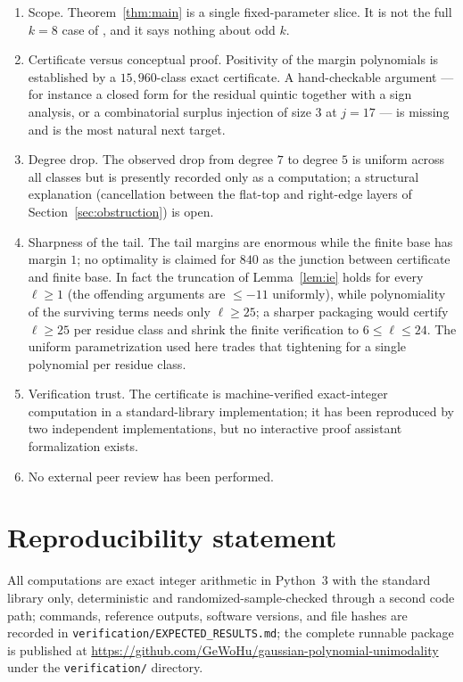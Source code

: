 \documentclass[11pt]{article}
\theoremstyle{definition}
\begin{document}
\begin{enumerate}
\item Scope. Theorem~\ref{thm:main} is a single fixed-parameter slice. It is not the full $k=8$
case of \cite{sz}, and it says nothing about odd $k$.
\item Certificate versus conceptual proof. Positivity of the margin polynomials is established by a
$15{,}960$-class exact certificate. A hand-checkable argument — for instance a closed form for the
residual quintic together with a sign analysis, or a combinatorial surplus injection of size $3$ at
$j=17$ — is missing and is the most natural next target.
\item Degree drop. The observed drop from degree $7$ to degree $5$ is uniform across all classes but
is presently recorded only as a computation; a structural explanation (cancellation between the
flat-top and right-edge layers of Section~\ref{sec:obstruction}) is open.
\item Sharpness of the tail. The tail margins are enormous while the finite base has margin $1$;
no optimality is claimed for $840$ as the junction between certificate and finite base. In fact the
truncation of Lemma~\ref{lem:ie} holds for every $\ell\ge1$ (the offending arguments are $\le -11$ uniformly),
while polynomiality of the surviving terms needs only $\ell\ge25$; a sharper packaging would certify
$\ell\ge25$ per residue class and shrink the finite verification to $6\le\ell\le24$. The uniform
parametrization used here trades that tightening for a single polynomial per residue class.
\item Verification trust. The certificate is machine-verified exact-integer computation in a
standard-library implementation; it has been reproduced by two independent implementations, but no
interactive proof assistant formalization exists.
\item No external peer review has been performed.
\end{enumerate}

\section*{Reproducibility statement}
All computations are exact integer arithmetic in Python~3 with the standard library only, deterministic
and randomized-sample-checked through a second code path; commands, reference outputs, software
versions, and file hashes are recorded in \texttt{verification/EXPECTED\_RESULTS.md}; the complete
runnable package is published at
\url{https://github.com/GeWoHu/gaussian-polynomial-unimodality} under the
\texttt{verification/} directory.



\end{document}
